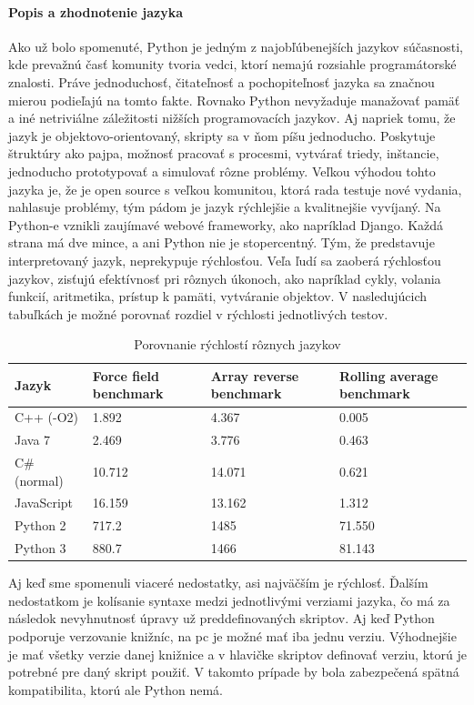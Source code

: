 \paragraph{Popis a zhodnotenie jazyka}
\indent Ako už bolo spomenuté, Python je jedným z najobľúbenejších jazykov súčasnosti, kde prevažnú časť komunity tvoria vedci, ktorí nemajú rozsiahle programátorské znalosti. Práve jednoduchosť, čitateľnosť a pochopiteľnosť jazyka sa značnou mierou podieľajú na tomto fakte. Rovnako Python nevyžaduje manažovať pamäť a iné netriviálne záležitosti nižších programovacích jazykov. Aj napriek tomu, že jazyk je objektovo-orientovaný, skripty sa v ňom píšu jednoducho. Poskytuje štruktúry ako pajpa, možnosť pracovať s procesmi, vytvárať triedy, inštancie, jednoducho prototypovať a simulovať rôzne problémy. Veľkou výhodou tohto jazyka je, že je open source s veľkou komunitou, ktorá rada testuje nové vydania, nahlasuje problémy, tým pádom je jazyk rýchlejšie a kvalitnejšie vyvíjaný. Na Python-e vznikli zaujímavé webové frameworky, ako napríklad Django. Každá strana má dve mince, a ani Python nie je stopercentný. Tým, že predstavuje interpretovaný jazyk, neprekypuje rýchlosťou. Veľa ľudí sa zaoberá rýchlosťou jazykov, zisťujú efektívnosť pri rôznych úkonoch, ako napríklad cykly, volania funkcií, aritmetika, prístup k pamäti, vytváranie objektov. V nasledujúcich tabuľkách je možné porovnať rozdiel v rýchlosti jednotlivých testov. 
\begin{center}
	\begin{table}[htbp]
		\begin{tabular}{|p{3.5cm}|p{3.5cm}|p{3.5cm}|p{3.5cm}|}
			\hline
			\textbf{Jazyk} & \textbf{Force field benchmark}  & \textbf{Array reverse benchmark}&\textbf{Rolling average benchmark} \\ 
			\hline
			C++ (-O2)&1.892&4.367&0.005\\
			\hline
			Java 7&2.469&3.776&0.463\\
			\hline
			C\# (normal)&10.712&14.071&0.621\\
			\hline
			JavaScript&16.159&13.162&1.312\\
			\hline
			Python 2&717.2&1485&71.550\\
			\hline
			Python 3&880.7&1466&81.143\\
			\hline
		\end{tabular}
		\caption{Porovnanie rýchlostí rôznych jazykov\cite{gitspeed}}
		\label{table:1}
	\end{table}
\end{center}
Aj keď sme spomenuli viaceré nedostatky, asi najväčším je rýchlosť. Ďalším nedostatkom je kolísanie syntaxe medzi jednotlivými verziami jazyka, čo má za následok nevyhnutnosť úpravy už preddefinovaných skriptov. Aj keď Python podporuje verzovanie knižníc, na \acrshort{pc} je možné mať iba jednu verziu. Výhodnejšie je mať všetky verzie danej knižnice a v hlavičke skriptov definovať verziu, ktorú je potrebné pre daný skript použiť. V takomto prípade by bola zabezpečená spätná kompatibilita, ktorú ale Python nemá.
